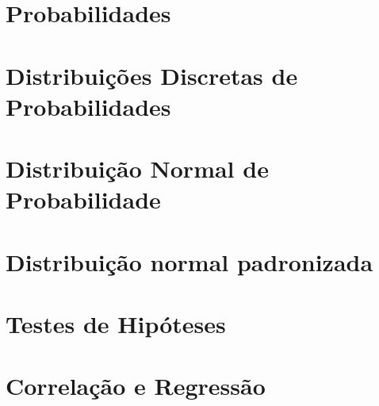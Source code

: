 \documentclass[
]{book}
\begin{document}
\hypertarget{probabilidades}{%
\chapter{Probabilidades}\label{probabilidades}}

\hypertarget{distribuiuxe7uxf5es-discretas-de-probabilidades}{%
\chapter{Distribuições Discretas de Probabilidades}\label{distribuiuxe7uxf5es-discretas-de-probabilidades}}

\hypertarget{distribuiuxe7uxe3o-normal-de-probabilidade}{%
\chapter{Distribuição Normal de Probabilidade}\label{distribuiuxe7uxe3o-normal-de-probabilidade}}

\hypertarget{distribuiuxe7uxe3o-normal-padronizada}{%
\chapter{Distribuição normal padronizada}\label{distribuiuxe7uxe3o-normal-padronizada}}

\hypertarget{testes-de-hipuxf3teses}{%
\chapter{Testes de Hipóteses}\label{testes-de-hipuxf3teses}}

\hypertarget{correlauxe7uxe3o-e-regressuxe3o}{%
\chapter{Correlação e Regressão}\label{correlauxe7uxe3o-e-regressuxe3o}}

  
\end{document}
